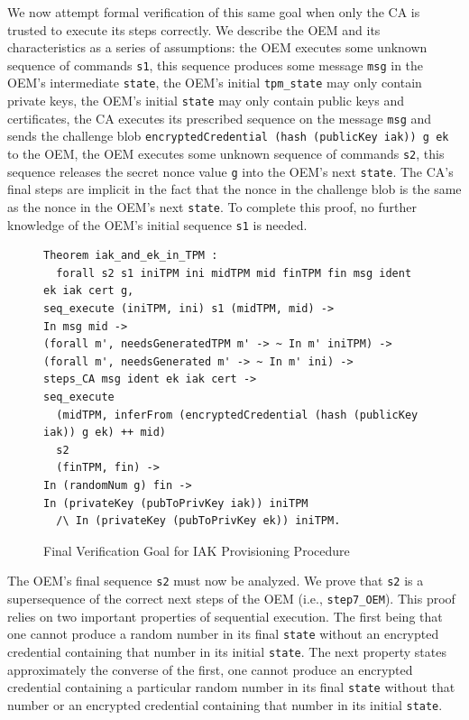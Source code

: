 \documentclass[runningheads]{llncs}
\begin{document}
We now attempt formal verification of this same goal when only the CA
is trusted to execute its steps correctly.  We describe the OEM and its
characteristics as a series of assumptions: the OEM executes some
unknown sequence of commands \verb|s1|, this sequence produces some
message \verb|msg| in the OEM's intermediate \verb|state|, the OEM's
initial \verb|tpm_state| may only contain private keys, the OEM's
initial \verb|state| may only contain public keys and certificates,
the CA executes its prescribed sequence on the message \verb|msg| and
sends the challenge blob
\verb|encryptedCredential (hash (publicKey iak)) g ek| to the OEM, the
OEM executes some unknown sequence of commands \verb|s2|, this
sequence releases the secret nonce value \verb|g| into the OEM's next
\verb|state|. The CA's final steps are implicit in the fact that the
nonce in the challenge blob is the same as the nonce in the OEM's next
\verb|state|.  To complete this proof, no further knowledge of the OEM's initial
sequence \verb|s1| is needed.  

\begin{figure}[hptb]
\begin{lstlisting}[language=Coq]
Theorem iak_and_ek_in_TPM :
  forall s2 s1 iniTPM ini midTPM mid finTPM fin msg ident ek iak cert g,
seq_execute (iniTPM, ini) s1 (midTPM, mid) -> 
In msg mid ->
(forall m', needsGeneratedTPM m' -> ~ In m' iniTPM) ->
(forall m', needsGenerated m' -> ~ In m' ini) ->
steps_CA msg ident ek iak cert ->
seq_execute
  (midTPM, inferFrom (encryptedCredential (hash (publicKey iak)) g ek) ++ mid)
  s2 
  (finTPM, fin) ->
In (randomNum g) fin ->
In (privateKey (pubToPrivKey iak)) iniTPM
  /\ In (privateKey (pubToPrivKey ek)) iniTPM.
\end{lstlisting}
\caption{Final Verification Goal for IAK Provisioning Procedure}
\label{fig:iak_goal}
\end{figure}

The OEM's final sequence \verb|s2| must now be analyzed.  We prove
that \verb|s2| is a supersequence of the correct next steps of the OEM
(i.e., \verb|step7_OEM|). This proof relies on two important
properties of sequential execution. The first being that one cannot
produce a random number in its final \verb|state| without an encrypted
credential containing that number in its initial \verb|state|. The
next property states approximately the converse of the first, one
cannot produce an encrypted credential containing a particular random
number in its final \verb|state| without that number or an encrypted
credential containing that number in its initial \verb|state|.
\end{document}
